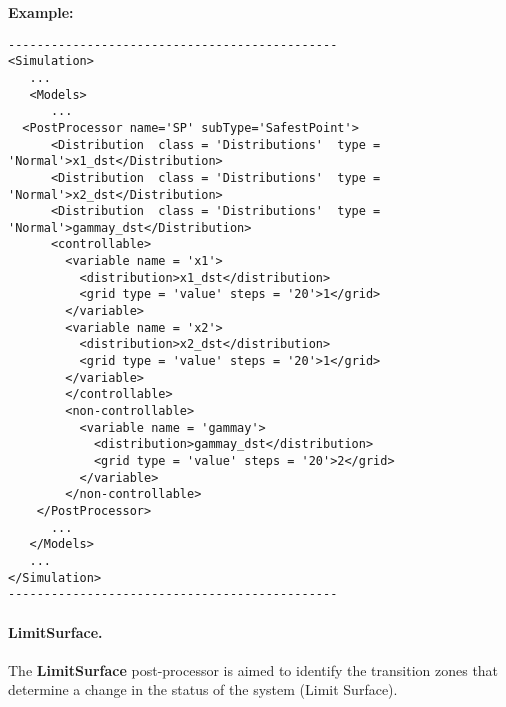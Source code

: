 \textbf{Example:}
\begin{lstlisting}[style=XML]
----------------------------------------------
<Simulation>
   ...
   <Models>
      ...
  <PostProcessor name='SP' subType='SafestPoint'>
      <Distribution  class = 'Distributions'  type = 'Normal'>x1_dst</Distribution>
      <Distribution  class = 'Distributions'  type = 'Normal'>x2_dst</Distribution>
      <Distribution  class = 'Distributions'  type = 'Normal'>gammay_dst</Distribution>
      <controllable>
        <variable name = 'x1'>
          <distribution>x1_dst</distribution>
          <grid type = 'value' steps = '20'>1</grid>
        </variable>
        <variable name = 'x2'>
          <distribution>x2_dst</distribution>
          <grid type = 'value' steps = '20'>1</grid>
        </variable>
        </controllable>
        <non-controllable>
          <variable name = 'gammay'>
            <distribution>gammay_dst</distribution>
            <grid type = 'value' steps = '20'>2</grid>
          </variable>
        </non-controllable>
    </PostProcessor>
      ...
   </Models>
   ...
</Simulation>
----------------------------------------------
\end{lstlisting}
\paragraph{LimitSurface.}
\label{LimitSurface}
The \textbf{LimitSurface} post-processor is aimed to identify the transition
zones that determine a change in the status of the system (Limit Surface).

